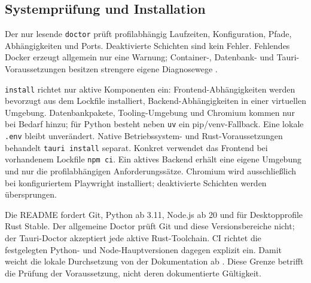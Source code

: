 \subsection{Systemprüfung und Installation}
\label{subsec:systempruefung-installation}

Der nur lesende \texttt{doctor} prüft profilabhängig Laufzeiten, Konfiguration,
Pfade, Abhängigkeiten und Ports. Deaktivierte Schichten sind kein Fehler.
Fehlendes Docker erzeugt allgemein nur eine Warnung; Container-, Datenbank- und
Tauri-Voraussetzungen besitzen strengere eigene Diagnosewege
\parencite{kleiveist2026tooling,kleiveist2026configuration}.

\texttt{install} richtet nur aktive Komponenten ein: Frontend-Abhängigkeiten
werden bevorzugt aus dem Lockfile installiert, Backend-Abhängigkeiten in einer
virtuellen Umgebung. Datenbankpakete, Tooling-Umgebung und Chromium kommen nur
bei Bedarf hinzu; für Python besteht neben \texttt{uv} ein pip/venv-Fallback.
Eine lokale \texttt{.env} bleibt unverändert. Native Betriebssystem- und
Rust-Voraussetzungen behandelt \texttt{tauri install} separat.
Konkret verwendet das Frontend bei vorhandenem Lockfile \texttt{npm ci}. Ein
aktives Backend erhält eine eigene Umgebung und nur die profilabhängigen
Anforderungssätze. Chromium wird ausschließlich bei konfiguriertem Playwright
installiert; deaktivierte Schichten werden übersprungen.

Die README fordert Git, Python ab 3.11, Node.js ab 20 und für Desktopprofile
Rust Stable. Der allgemeine Doctor prüft Git und diese Versionsbereiche nicht;
der Tauri-Doctor akzeptiert jede aktive Rust-Toolchain. CI richtet die
festgelegten Python- und Node-Hauptversionen dagegen explizit ein. Damit weicht
die lokale Durchsetzung von der Dokumentation ab
\parencite{kleiveist2026template,kleiveist2026ci}.
Diese Grenze betrifft die Prüfung der Voraussetzung, nicht deren dokumentierte
Gültigkeit.
